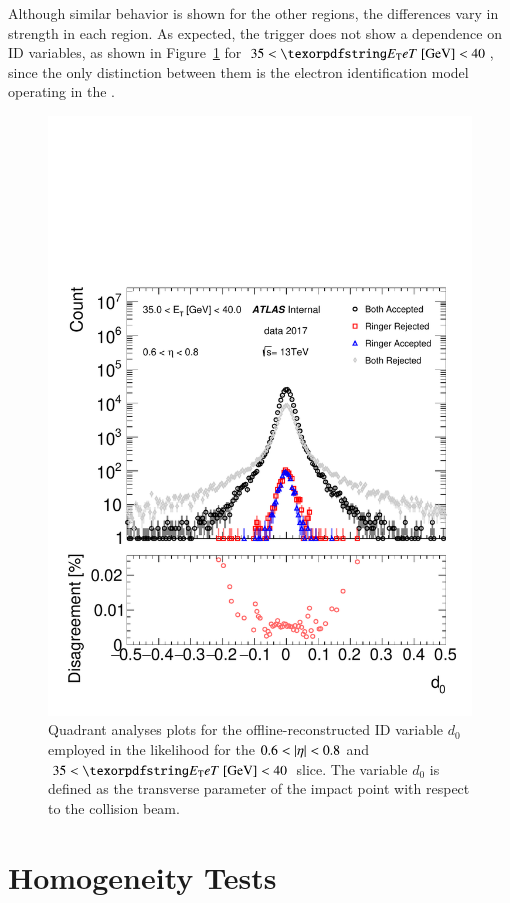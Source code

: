 Although similar behavior is shown for the other 
regions, the differences vary in strength in each \abseta{} region. As expected, 
the trigger does not show a dependence on ID variables, as shown in Figure~\ref{fig:quadrant_track_variables_30GeV} for $35<\et{}~[\text{GeV}]<40$, since the only distinction between them is the electron identification model operating in the \fastcalo{}.


\begin{figure}[h!tb]
\centering
\includegraphics[width=.5\textwidth]{sections/05_analysis/figures/quadrant_plots/d0.pdf}

\caption{\label{fig:quadrant_track_variables_30GeV}
Quadrant analyses plots for the offline-reconstructed ID variable $d_0$ employed in the
likelihood for the $0.6<\abseta{}<0.8$ and $35<\et{}~[\text{GeV}]<40$ slice. The variable $d_0$ is defined as the transverse parameter of the impact point with respect to the collision beam.
}
\end{figure}






\FloatBarrier
\section[Homogeneity Tests]{Homogeneity Tests}\label{ssec:agreement}

